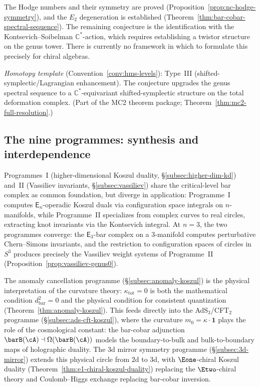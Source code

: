 \begin{remark}[Scope]\label{rem:nc-hodge-scope}
The Hodge numbers and their symmetry are proved
(Proposition~\ref{prop:nc-hodge-symmetry}), and the $E_2$
degeneration is established
(Theorem~\ref{thm:bar-cobar-spectral-sequence}).  The remaining
conjecture is the identification with the Kontsevich--Soibelman
$\mathbb{C}^*$-action, which requires establishing a twistor
structure on the genus tower.  There is currently no framework
in which to formulate this precisely for chiral algebras.

\emph{Homotopy template} (Convention~\ref{conv:hms-levels}): Type~III
(shifted-symplectic/Lagrangian enhancement).  The conjecture
upgrades the genus spectral sequence to a $\mathbb{C}^*$-equivariant
shifted-symplectic structure on the total deformation complex.
(Part of the MC2 theorem package; Theorem~\ref{thm:mc2-full-resolution}.)
\end{remark}

\subsection{The nine programmes: synthesis and interdependence}
\label{subsec:programme-synthesis}

Programmes~I (higher-dimensional Koszul duality,
\S\ref{subsec:higher-dim-kd}) and~II (Vassiliev invariants,
\S\ref{subsec:vassiliev}) share the critical-level bar complex
as common foundation, but diverge in application: Programme~I
computes $\mathsf{E}_n$-operadic Koszul duals via configuration
space integrals on $n$-manifolds, while Programme~II specializes
from complex curves to real circles, extracting knot invariants via
the Kontsevich integral.  At $n = 3$, the two programmes converge:
the $\mathsf{E}_3$-bar complex on a $3$-manifold computes
perturbative Chern--Simons invariants, and the restriction to
configuration spaces of circles in $S^3$ produces precisely the
Vassiliev weight systems of Programme~II
(Proposition~\ref{prop:vassiliev-genus0}).

The anomaly cancellation programme
(\S\ref{subsec:anomaly-koszul}) is the physical interpretation of
the curvature theory: $\kappa_{\mathrm{tot}} = 0$ is both the
mathematical condition $d_{\mathrm{bar}}^2 = 0$ and the
physical condition for consistent quantization
(Theorem~\ref{thm:anomaly-koszul}).  This feeds directly into the
AdS$_3$/CFT$_2$ programme (\S\ref{subsec:ads-cft-koszul}), where
the curvature $m_0 = \kappa \cdot \mathbf{1}$ plays the role of
the cosmological constant: the bar-cobar adjunction
$\barB(\cA) \dashv \Omega(\barB(\cA))$ models the
boundary-to-bulk and bulk-to-boundary maps of holographic duality.
The $3$d mirror symmetry programme (\S\ref{subsec:3d-mirror})
extends this physical circle from $2$d to $3$d, with
$\Eone$-chiral Koszul duality
(Theorem~\ref{thm:e1-chiral-koszul-duality}) replacing the
$\Etwo$-chiral theory and Coulomb--Higgs exchange replacing
bar-cobar inversion.

